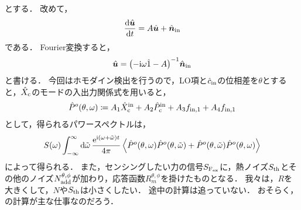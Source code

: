 \documentclass{report}
\begin{document}
    とする．
    改めて，
    \begin{align}
      \dv{\hat{\bm{u}}}{t} = A\hat{\bm{u}} + \hat{\bm{n}}_{\mathrm{in}}
    \end{align}
    である．
    Fourier変換すると，
    \begin{align}
      \hat{\bm{u}} = \qty(-\mathrm{i}\omega\hat{1} - A)^{-1}\hat{\bm{n}}_{\mathrm{in}}
    \end{align}
    と書ける．
    今回はホモダイン検出を行うので，LO項と$\hat{c}_{\mathrm{in}}$の位相差を$\theta$とすると，$\hat{X}_{\mathrm{c}}$のモードの入出力関係式を用いると，
    \begin{align}
      \hat{P}^o(\theta, \omega)\coloneqq A_1\hat{X}^{\mathrm{in}}_{\mathrm{c}} + A_2\hat{P}^{\mathrm{in}}_{\mathrm{c}} + A_3f_{\mathrm{in, 1}} + A_4f_{\mathrm{in, 1}} \label{PhysRevA.111.053508-main-work}
    \end{align}
    として，得られるパワースペクトルは，
    \begin{align}
      S(\omega) \int_{-\infty}^{\infty}\dd{\tilde{\omega}}\frac{\e^{\i\qty(\omega + \tilde{\omega})t}}{4\pi}\ev{\hat{P}^o(\theta, \omega)\hat{P}^o(\theta, \tilde{\omega}) + \hat{P}^o(\theta, \tilde{\omega})\hat{P}^o(\theta, \omega)}
    \end{align}
    によって得られる．
    また，センシングしたい力の信号$S_{\mathrm{F_{ex}}}$に，熱ノイズ$S_{\mathrm{th}}$とその他のノイズ$N^{\theta, \phi}_{\mathrm{add}}$が加わり，応答函数$R^{\theta, \phi}_m$を掛けたものとなる．
    我々は，$R$を大きくして，$N$や$S_{\mathrm{th}}$は小さくしたい．
    途中の計算は追っていない．
    おそらく，の計算が主な仕事なのだろう．
  \appendix
\end{document}
